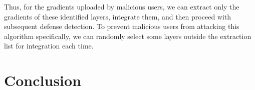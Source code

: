 \documentclass[conference]{IEEEtran}
\begin{document}
Thus, for the gradients uploaded by malicious users, we can extract only the gradients of these identified layers, integrate them, and then proceed with subsequent defense detection. To prevent malicious users from attacking this algorithm specifically, we can randomly select some layers outside the extraction list for integration each time.










\section{Conclusion}
\label{sec:conclusion}




\end{document}
